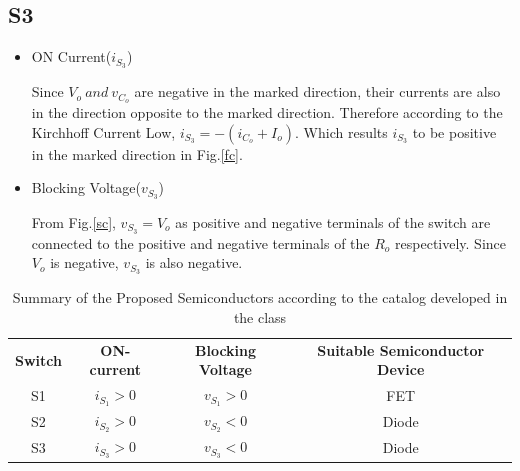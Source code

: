 \documentclass[a4paper,11pt]{article}%
\begin{document}
\subsection*{S3}
\begin{itemize}
	\item ON Current($i_{S_3}$)	
	
	Since $V_o~and ~v_{C_o}$ are negative in the marked direction, their currents are also in the direction opposite to the marked direction. Therefore according to the Kirchhoff Current Low, $i_{S_3} = -(i_{C_o} + I_o)$. Which results $i_{S_3}$ to be positive in the marked direction in Fig.\ref{fc}.
	
	\item Blocking Voltage($v_{S_3}$)
	
	From Fig.\ref{sc}, $v_{S_3} = V_o$ as positive and negative terminals of the switch are connected to the positive and negative terminals of the $R_o$ respectively. Since $V_o$ is negative, $v_{S_3}$ is also negative.
	
\end{itemize}

\begin{table}[!h]
	\centering
	\begin{tabular}{c c c c}
		\textbf{Switch} & \textbf{ON-current} & \textbf{Blocking Voltage} & \textbf{Suitable Semiconductor Device}\\
		S1& $i_{S_1} >0$& $v_{S_1} > 0$& FET\\
		S2& $i_{S_2}>0$ & $v_{S_2} < 0$  & Diode\\
		S3& $i_{S_3}>0$ & $v_{S_3} <0$ & Diode\\
	\end{tabular}
	\caption{Summary of the Proposed Semiconductors according to the catalog developed in the class}
\end{table}
\end{document}
